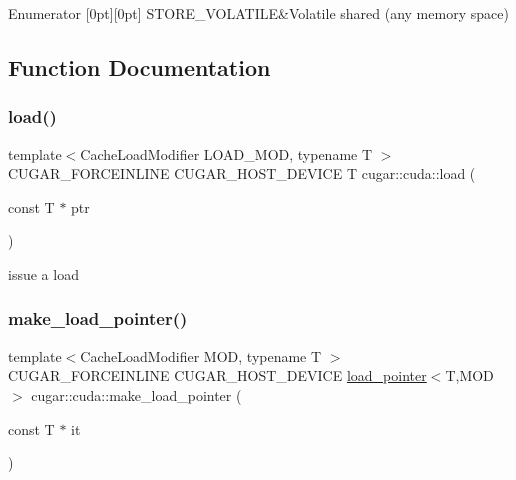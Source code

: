 \begin{DoxyEnumFields}{Enumerator}
[0pt][0pt]{}\mbox{\label{group___c_u_d_a_module_gga66c87645c20c37932d6a02fcb57eebeaa3e5003613374672c2dd6956dab94972b}} 
S\+T\+O\+R\+E\+\_\+\+V\+O\+L\+A\+T\+I\+LE&Volatile shared (any memory space) \\
\hline

\end{DoxyEnumFields}


\subsection{Function Documentation}
\mbox{\label{group___c_u_d_a_module_ga2786ba75af2a254c03f272b6211b6379}} 
\subsubsection{\texorpdfstring{load()}{load()}}
{\footnotesize\ttfamily template$<$Cache\+Load\+Modifier L\+O\+A\+D\+\_\+\+M\+OD, typename T $>$ \\
C\+U\+G\+A\+R\+\_\+\+F\+O\+R\+C\+E\+I\+N\+L\+I\+NE C\+U\+G\+A\+R\+\_\+\+H\+O\+S\+T\+\_\+\+D\+E\+V\+I\+CE T cugar\+::cuda\+::load (\begin{DoxyParamCaption}\item[{const T $\ast$}]{ptr }\end{DoxyParamCaption})}

issue a load \mbox{\label{group___c_u_d_a_module_ga985b1000130fbe4bc8fdc5191499f69e}} 
\subsubsection{\texorpdfstring{make\+\_\+load\+\_\+pointer()}{make\_load\_pointer()}}
{\footnotesize\ttfamily template$<$Cache\+Load\+Modifier M\+OD, typename T $>$ \\
C\+U\+G\+A\+R\+\_\+\+F\+O\+R\+C\+E\+I\+N\+L\+I\+NE C\+U\+G\+A\+R\+\_\+\+H\+O\+S\+T\+\_\+\+D\+E\+V\+I\+CE \hyperlink{structcugar_1_1cuda_1_1load__pointer}{load\+\_\+pointer}$<$T,M\+OD$>$ cugar\+::cuda\+::make\+\_\+load\+\_\+pointer (\begin{DoxyParamCaption}\item[{const T $\ast$}]{it }\end{DoxyParamCaption})}

